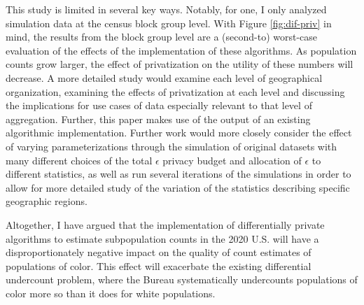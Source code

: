 This study is limited in several key ways. Notably, for one, I only analyzed simulation data at the census block group level. With Figure \ref{fig:dif-priv} in mind, the results from the block group level are a (second-to) worst-case evaluation of the effects of the implementation of these algorithms. As population counts grow larger, the effect of privatization on the utility of these numbers will decrease. A more detailed study would examine each level of geographical organization, examining the effects of privatization at each level and discussing the implications for use cases of data especially relevant to that level of aggregation. Further, this paper makes use of the output of an existing algorithmic implementation. Further work would more closely consider the effect of varying parameterizations through the simulation of original datasets with many different choices of the total $\epsilon$ privacy budget and allocation of $\epsilon$ to different statistics, as well as run several iterations of the simulations in order to allow for more detailed study of the variation of the statistics describing specific geographic regions.

Altogether, I have argued that the implementation of differentially private algorithms to estimate subpopulation counts in the 2020 U.S. will have a disproportionately negative impact on the quality of count estimates of populations of color. This effect will exacerbate the existing differential undercount problem, where the Bureau systematically undercounts populations of color more so than it does for white populations.



